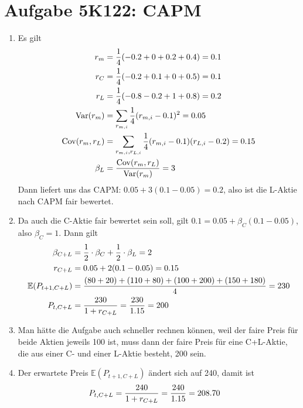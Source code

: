 \documentclass{article}
\newcommand{\E}{\mathbb{E}}
\DeclareMathOperator{\Var}{Var}
\DeclareMathOperator{\Cov}{Cov}
\begin{document}
	\section*{Aufgabe 5K122: CAPM}
	\begin{enumerate}[label=(\alph*)]
		\item Es gilt
		\begin{align}
			r_m &= \frac{1}{4}(-0.2 + 0 + 0.2 + 0.4) = 0.1 \notag \\
			r_C &= \frac{1}{4}(-0.2 + 0.1 + 0 + 0.5) = 0.1 \notag \\
			r_L &= \frac{1}{4}(-0.8 - 0.2 + 1 + 0.8) = 0.2 \notag \\
			\Var(r_m) &= \sum_{r_{m,i}} \frac{1}{4}(r_{m,i} - 0.1)^2 = 0.05 \notag \\
			\Cov(r_m,r_L) &= \sum_{r_{m,i},r_{L,i}} \frac{1}{4}(r_{m,i}-0.1)(r_{L,i}-0.2) = 0.15 \notag \\
			\beta_L &= \frac{\Cov(r_m,r_L)}{\Var(r_m)} = 3 \notag
		\end{align}
		Dann liefert uns das CAPM: $0.05 + 3(0.1-0.05)=0.2$, also ist die L-Aktie nach CAPM fair bewertet.
		\item Da auch die C-Aktie fair bewertet sein soll, gilt $0.1=0.05+\beta_C (0.1-0.05)$, also $\beta_C=1$. Dann gilt
		\begin{align}
			\beta_{C+L} &= \frac{1}{2}\cdot \beta_C + \frac{1}{2}\cdot\beta_L = 2 \notag \\
			r_{C+L} &= 0.05 + 2(0.1-0.05) = 0.15 \notag \\
			\E(P_{t+1,C+L}) &= \frac{(80+20)+(110+80)+(100+200)+(150+180)}{4} = 230 \notag \\
			P_{t,C+L} &= \frac{230}{1+r_{C+L}} = \frac{230}{1.15} = 200 \notag
		\end{align}
		\item Man hätte die Aufgabe auch schneller rechnen können, weil der faire Preis für beide Aktien jeweils 100 ist, muss dann der faire Preis für eine C+L-Aktie, die aus einer C- und einer L-Aktie besteht, 200 sein.
		\item Der erwartete Preis $\E(P_{t+1,C+L})$ ändert sich auf 240, damit ist
		\begin{align}
			P_{t,C+L} &= \frac{240}{1+r_{C+L}} = \frac{240}{1.15} = 208.70 \notag
		\end{align}
	\end{enumerate}
\end{document}
